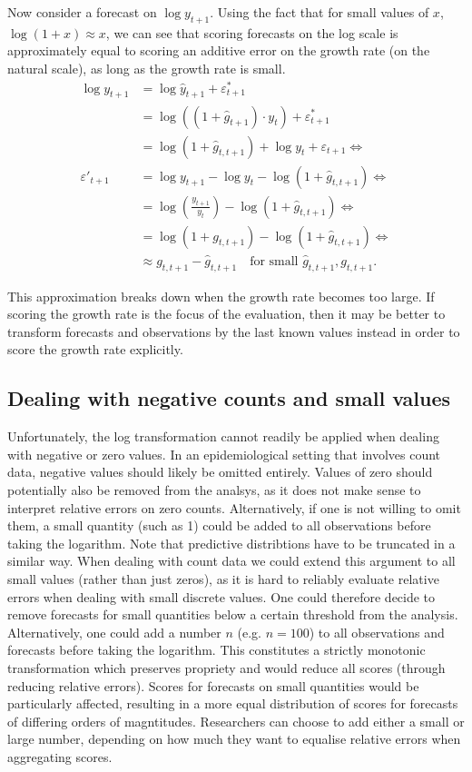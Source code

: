 \documentclass{article}
\begin{document}
Now consider a forecast on $\log y_{t+1}$. Using the fact that for small values of $x$, $\log (1+ x) \approx x$, we can see that scoring forecasts on the log scale is approximately equal to scoring an additive error on the growth rate (on the natural scale), as long as the growth rate is small.
%
\begin{align}
\log y_{t+1}        &= \log \hat{y}_{t+1} + \varepsilon^*_{t+1} \\
                    &= \log ((1 + \hat{g}_{t+1}) \cdot y_{t}) + \varepsilon^*_{t+1} \\
                    &= \log (1 + \hat{g}_{t, t+1}) + \log y_t + \varepsilon_{t+1} \Leftrightarrow \\
\varepsilon'_{t+1}  &= \log y_{t+1} -  \log y_t - \log (1 + \hat{g}_{t, t+1}) \Leftrightarrow \\    
                    &= \log (\frac{y_{t+1}}{y_t}) - \log (1 + \hat{g}_{t, t+1}) \Leftrightarrow \\    
                    &= \log (1 + g_{t, t+1}) - \log (1 + \hat{g}_{t, t+1}) \Leftrightarrow \\   
                    &\approx g_{t, t+1} - \hat{g}_{t, t+1} \quad \text{for small } \hat{g}_{t, t+1}, g_{t, t+1}. 
\end{align}

This approximation breaks down when the growth rate becomes too large. If scoring the growth rate is the focus of the evaluation, then it may be better to transform forecasts and observations by the last known values instead in order to score the growth rate explicitly. 

\subsection{Dealing with negative counts and small values}
Unfortunately, the log transformation cannot readily be applied when dealing with negative or zero values. In an epidemiological setting that involves count data, negative values should likely be omitted entirely. Values of zero should potentially also be removed from the analsys, as it does not make sense to interpret relative errors on zero counts. Alternatively, if one is not willing to omit them, a small quantity (such as 1) could be added to all observations before taking the logarithm. Note that predictive distribtions have to be truncated in a similar way. When dealing with count data we could extend this argument to all small values (rather than just zeros), as it is hard to reliably evaluate relative errors when dealing with small discrete values. One could therefore decide to remove forecasts for small quantities below a certain threshold from the analysis. Alternatively, one could add a number $n$ (e.g. $n = 100$) to all observations and forecasts before taking the logarithm. This constitutes a strictly monotonic transformation which preserves propriety and would reduce all scores (through reducing relative errors). Scores for forecasts on small quantities would be particularly affected, resulting in a more equal distribution of scores for forecasts of differing orders of magntitudes. Researchers can choose to add either a small or large number, depending on how much they want to equalise relative errors when aggregating scores. 
\end{document}
